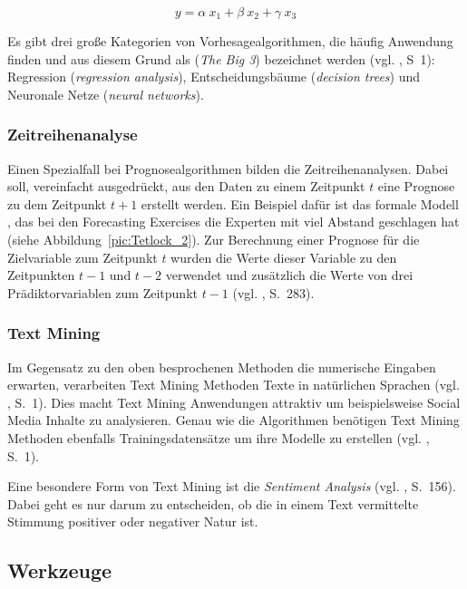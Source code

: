 \begin{equation}
y = \alpha~x_1 + \beta~x_2 + \gamma~x_3
\label{eq:linear_regression}
\end{equation}

Es gibt drei große Kategorien von Vorhesagealgorithmen, die häufig Anwendung finden und aus diesem Grund als
\grqq{} (\emph{The Big 3}) bezeichnet werden (vgl. \cite{McCarthy}, S~1): Regression (\emph{regression analysis}),
Entscheidungsbäume (\emph{decision trees}) und Neuronale Netze (\emph{neural networks}).



\subsubsection{Zeitreihenanalyse}

Einen Spezialfall bei Prognosealgorithmen bilden die Zeitreihenanalysen. Dabei
soll, vereinfacht ausgedrückt, aus den Daten zu einem Zeitpunkt $t$ eine Prognose zu dem Zeitpunkt $t+1$
erstellt werden. Ein Beispiel dafür ist das formale Modell , das bei den Forecasting
Exercises die Experten mit viel Abstand geschlagen hat (siehe Abbildung~\ref{pic:Tetlock_2}).  
Zur Berechnung einer Prognose für die Zielvariable zum Zeitpunkt $t$ wurden die Werte dieser Variable
zu den Zeitpunkten $t-1$ und $t-2$ verwendet und zusätzlich die Werte von drei Prädiktorvariablen zum Zeitpunkt $t-1$   
(vgl. \cite{Tetlock}, S.~283).

\subsubsection{Text Mining}

Im Gegensatz zu den oben besprochenen Methoden die numerische Eingaben erwarten, verarbeiten Text Mining
Methoden Texte in natürlichen Sprachen (vgl. \cite{Weiss}, S.~1). Dies macht Text Mining Anwendungen attraktiv um
beispielsweise Social Media Inhalte zu analysieren. Genau wie die \grqq Algorithmen benötigen Text Mining
Methoden ebenfalls Trainingsdatensätze um ihre Modelle zu erstellen (vgl. \cite{Weiss}, S.~1).

Eine besondere Form von Text Mining ist die \emph{Sentiment Analysis} (vgl. \cite{Weiss}, S.~156). Dabei geht es nur darum
zu entscheiden, ob die in einem Text vermittelte Stimmung positiver oder negativer Natur ist.

\subsection{Werkzeuge}

